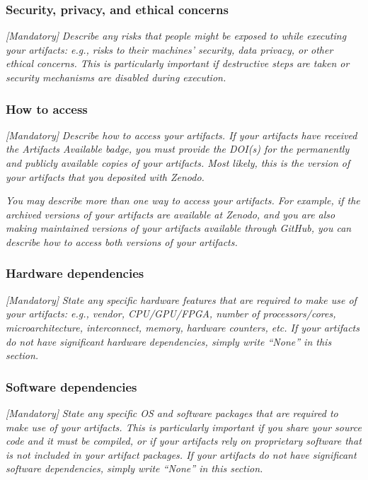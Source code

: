 \documentclass[nonacm,sigconf]{acmart}
\begin{document}

\subsubsection{Security, privacy, and ethical concerns}

\emph{[Mandatory]}
%
\emph{Describe any risks that people might be exposed to while
executing your artifacts: e.g., risks to their machines' security,
data privacy, or other ethical concerns.  This is particularly
important if destructive steps are taken or security mechanisms are
disabled during execution.}


\subsubsection{How to access}

\emph{[Mandatory]}
%
\emph{Describe how to access your artifacts.  If your artifacts have
received the \emph{Artifacts Available} badge, you must provide the
DOI(s) for the permanently and publicly available copies of your
artifacts.  Most likely, this is the version of your artifacts that
you deposited with Zenodo.}

\emph{You may describe more than one way to access your artifacts.
For example, if the archived versions of your artifacts are available
at Zenodo, and you are also making maintained versions of your
artifacts available through GitHub, you can describe how to access
both versions of your artifacts.}


\subsubsection{Hardware dependencies}

\emph{[Mandatory]}
%
\emph{State any specific hardware features that are required to make
use of your artifacts: e.g., vendor, CPU/GPU/FPGA, number of
processors/cores, microarchitecture, interconnect, memory, hardware
counters, etc.  If your artifacts do not have significant hardware
dependencies, simply write ``None'' in this section.}


\subsubsection{Software dependencies}

\emph{[Mandatory]}
%
\emph{State any specific OS and software packages that are required to
make use of your artifacts.  This is particularly important if you
share your source code and it must be compiled, or if your artifacts
rely on proprietary software that is not included in your artifact
packages.  If your artifacts do not have significant software
dependencies, simply write ``None'' in this section.}
\end{document}
